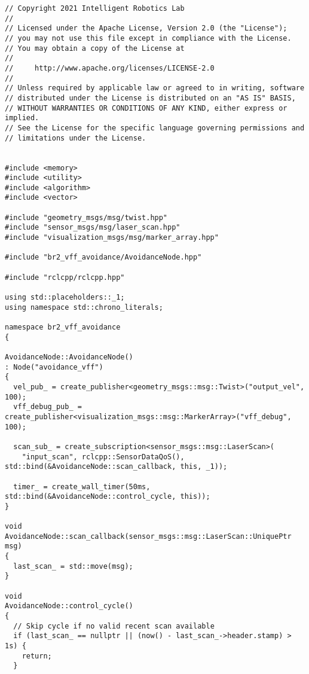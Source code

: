  \footnotesize
\begin{tcolorbox}[sharp corners, colframe=gray!80, colback=LightGray, left=0pt, top=0pt, bottom=0pt, title=\texttt{br2\_vff\_avoidance/src/br2\_vff\_avoidance/AvoidanceNode.cpp}]
  \begin{verbatim}
// Copyright 2021 Intelligent Robotics Lab
//
// Licensed under the Apache License, Version 2.0 (the "License");
// you may not use this file except in compliance with the License.
// You may obtain a copy of the License at
//
//     http://www.apache.org/licenses/LICENSE-2.0
//
// Unless required by applicable law or agreed to in writing, software
// distributed under the License is distributed on an "AS IS" BASIS,
// WITHOUT WARRANTIES OR CONDITIONS OF ANY KIND, either express or implied.
// See the License for the specific language governing permissions and
// limitations under the License.


#include <memory>
#include <utility>
#include <algorithm>
#include <vector>

#include "geometry_msgs/msg/twist.hpp"
#include "sensor_msgs/msg/laser_scan.hpp"
#include "visualization_msgs/msg/marker_array.hpp"

#include "br2_vff_avoidance/AvoidanceNode.hpp"

#include "rclcpp/rclcpp.hpp"

using std::placeholders::_1;
using namespace std::chrono_literals;

namespace br2_vff_avoidance
{

AvoidanceNode::AvoidanceNode()
: Node("avoidance_vff")
{
  vel_pub_ = create_publisher<geometry_msgs::msg::Twist>("output_vel", 100);
  vff_debug_pub_ = create_publisher<visualization_msgs::msg::MarkerArray>("vff_debug", 100);

  scan_sub_ = create_subscription<sensor_msgs::msg::LaserScan>(
    "input_scan", rclcpp::SensorDataQoS(), std::bind(&AvoidanceNode::scan_callback, this, _1));

  timer_ = create_wall_timer(50ms, std::bind(&AvoidanceNode::control_cycle, this));
}

void
AvoidanceNode::scan_callback(sensor_msgs::msg::LaserScan::UniquePtr msg)
{
  last_scan_ = std::move(msg);
}

void
AvoidanceNode::control_cycle()
{
  // Skip cycle if no valid recent scan available
  if (last_scan_ == nullptr || (now() - last_scan_->header.stamp) > 1s) {
    return;
  }


\end{verbatim}
\end{tcolorbox}

